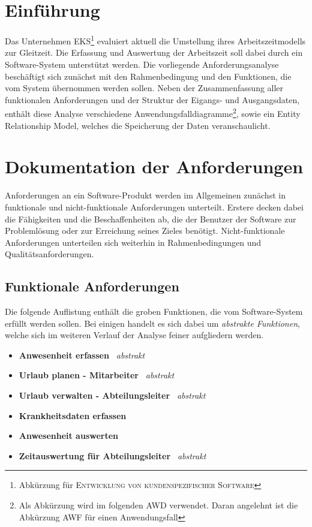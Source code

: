 \chapter{Einführung}
Das Unternehmen \textsc{EKS}\footnote{Abkürzung für \textsc{Entwicklung von kundenspezifischer Software}} evaluiert aktuell die Umstellung ihres Arbeitszeitmodells zur Gleitzeit. Die Erfassung und Auswertung der Arbeitszeit soll dabei durch ein Software-System unterstützt werden. Die vorliegende Anforderungsanalyse beschäftigt sich zunächst mit den Rahmenbedingung und den Funktionen, die vom System übernommen werden sollen. Neben der Zusammenfassung aller funktionalen Anforderungen und der Struktur der Eigangs- und Ausgangsdaten, enthält diese Analyse verschiedene Anwendungsfalldiagramme\footnote{Als Abkürzung wird im folgenden \textsc{AWD} verwendet. Daran angelehnt ist die Abkürzung \textsc{AWF} für einen Anwendungsfall}, sowie ein Entity Relationship Model, welches die Speicherung der Daten veranschaulicht.

\chapter{Dokumentation der Anforderungen}
Anforderungen an ein Software-Produkt werden im Allgemeinen zunächst in funktionale und nicht-funktionale Anforderungen unterteilt. Erstere decken dabei die Fähigkeiten und die Beschaffenheiten ab, die der Benutzer der Software zur Problemlösung oder zur Erreichung seines Zieles benötigt. Nicht-funktionale Anforderungen unterteilen sich weiterhin in Rahmenbedingungen und Qualitätsanforderungen.

\section{Funktionale Anforderungen}
Die folgende Auflistung enthält die groben Funktionen, die vom Software-System erfüllt werden sollen. Bei einigen handelt es sich dabei um \textit{abstrakte Funktionen}, welche sich im weiteren Verlauf der Analyse feiner aufgliedern werden.

\begin{itemize}
	\item \textbf{Anwesenheit erfassen} \textit{\guillemotleft \ abstrakt \ \guillemotright}
	\item \textbf{Urlaub planen - Mitarbeiter} \textit{\guillemotleft \ abstrakt \ \guillemotright}
	\item \textbf{Urlaub verwalten - Abteilungsleiter} \textit{\guillemotleft \ abstrakt \ \guillemotright}
	\item \textbf{Krankheitsdaten erfassen}
	\item \textbf{Anwesenheit auswerten}
	\item \textbf{Zeitauswertung für Abteilungsleiter} \textit{\guillemotleft \ abstrakt \ \guillemotright}
\end{itemize}

